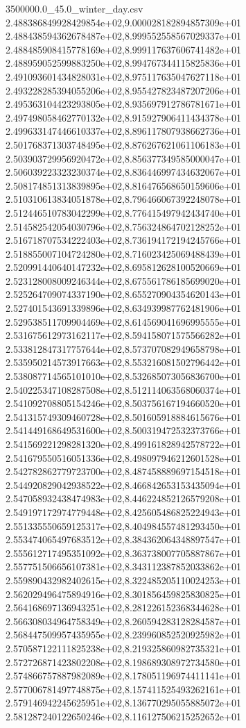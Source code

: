 \begin{filecontents*}{3500000.0_45.0_winter_day.csv}
2.488386849928429854e+02,9.000028182894857309e+01
2.488438594362678487e+02,8.999552558567029337e+01
2.488485908415778169e+02,8.999117637606741482e+01
2.488959052599883250e+02,8.994767344115825836e+01
2.491093601434828031e+02,8.975117635047627118e+01
2.493228285394055206e+02,8.955427823487207206e+01
2.495363104423293805e+02,8.935697912786781671e+01
2.497498058462770132e+02,8.915927906411434378e+01
2.499633147446610337e+02,8.896117807938662736e+01
2.501768371303748495e+02,8.876267621061106183e+01
2.503903729956920472e+02,8.856377349585000047e+01
2.506039223323230374e+02,8.836446997434632067e+01
2.508174851313839895e+02,8.816476568650159606e+01
2.510310613834051878e+02,8.796466067392248078e+01
2.512446510783042299e+02,8.776415497942434740e+01
2.514582542054030796e+02,8.756324864702128252e+01
2.516718707534222403e+02,8.736194172194245766e+01
2.518855007104724280e+02,8.716023425069488439e+01
2.520991440640147232e+02,8.695812628100520669e+01
2.523128008009246344e+02,8.675561786185699020e+01
2.525264709074337190e+02,8.655270904354620143e+01
2.527401543691339896e+02,8.634939987762481906e+01
2.529538511709904469e+02,8.614569041696995555e+01
2.531675612973162117e+02,8.594158071575566282e+01
2.533812847317757644e+02,8.573707082949658798e+01
2.535950214573917663e+02,8.553216081502796442e+01
2.538087714565101010e+02,8.532685073056836700e+01
2.540225347108287508e+02,8.512114063568060374e+01
2.541092708805154246e+02,8.503756167194660520e+01
2.541315749309460728e+02,8.501605918884615676e+01
2.541449168649531600e+02,8.500319472532373766e+01
2.541569221298281320e+02,8.499161828942578722e+01
2.541679550516051336e+02,8.498097946212601528e+01
2.542782862779723700e+02,8.487458889697154518e+01
2.544920829042938522e+02,8.466842653153435094e+01
2.547058932438474983e+02,8.446224852126579208e+01
2.549197172974779448e+02,8.425605486825224943e+01
2.551335550659125317e+02,8.404984557481293450e+01
2.553474065497683512e+02,8.384362064348897547e+01
2.555612717495351092e+02,8.363738007705887867e+01
2.557751506656107381e+02,8.343112387852033862e+01
2.559890432982402615e+02,8.322485205110024253e+01
2.562029496475894916e+02,8.301856459825830825e+01
2.564168697136943251e+02,8.281226152368344628e+01
2.566308034964758349e+02,8.260594283128284587e+01
2.568447509957435955e+02,8.239960852520925982e+01
2.570587122111825238e+02,8.219325860982735321e+01
2.572726871423802208e+02,8.198689308972734580e+01
2.574866757887982089e+02,8.178051196974411141e+01
2.577006781497748875e+02,8.157411525493262161e+01
2.579146942245625951e+02,8.136770295055885072e+01
2.581287240122650246e+02,8.116127506215252652e+01

\end{filecontents*}
